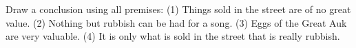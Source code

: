 Draw a conclusion using all premises: (1) Things sold in the street are of no great value. (2) Nothing but rubbish can be had for a song. (3) Eggs of the Great Auk are very valuable. (4) It is only what is sold in the street that is really rubbish.
